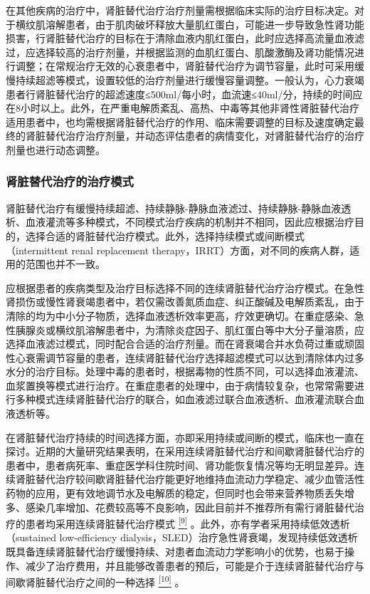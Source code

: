 在其他疾病的治疗中，肾脏替代治疗治疗剂量需根据临床实际的治疗目标决定。对于横纹肌溶解患者，由于肌肉破坏释放大量肌红蛋白，可能进一步导致急性肾功能损害，行肾脏替代治疗的目标在于清除血液内肌红蛋白，此时应选择高流量血液滤过，应选择较高的治疗剂量，并根据监测的血肌红蛋白、肌酸激酶及肾功能情况进行调整；在常规治疗无效的心衰患者中，肾脏替代治疗为调节容量，此时可采用缓慢持续超滤等模式，设置较低的治疗剂量进行缓慢容量调整。一般认为，心力衰竭患者行肾脏替代治疗的超滤速度≤500ml/每小时，血流速≤40ml/分，持续的时间应在8小时以上。此外，在严重电解质紊乱、高热、中毒等其他非肾性肾脏替代治疗适用患者中，也均需根据肾脏替代治疗的作用、临床需要调整的目标及速度确定最终的肾脏替代治疗治疗剂量，并动态评估患者的病情变化，对肾脏替代治疗的治疗剂量也进行动态调整。

\subsubsection{肾脏替代治疗的治疗模式}

肾脏替代治疗有缓慢持续超滤、持续静脉-静脉血液滤过、持续静脉-静脉血液透析、血液灌流等多种模式，不同模式治疗疾病的机制并不相同，因此应根据治疗目的，选择合适的肾脏替代治疗模式。此外，选择持续模式或间断模式（intermittent
renal replacement
therapy，IRRT）方面，对不同的疾病人群，适用的范围也并不一致。

应根据患者的疾病类型及治疗目标选择不同的连续肾脏替代治疗治疗模式。在急性肾损伤或慢性肾衰竭患者中，若仅需改善氮质血症、纠正酸碱及电解质紊乱，由于清除的均为中小分子物质，选择血液透析效率更高，疗效更确切。在重症感染、急性胰腺炎或横纹肌溶解患者中，为清除炎症因子、肌红蛋白等中大分子量溶质，应选择血液滤过模式，同时配合合适的治疗剂量。而在肾衰竭合并水负荷过重或顽固性心衰需调节容量的患者，连续肾脏替代治疗选择超滤模式可以达到清除体内过多水分的治疗目标。处理中毒的患者时，根据毒物的性质不同，可以选择血液灌流、血浆置换等模式进行治疗。在重症患者的处理中，由于病情较复杂，也常常需要进行多种模式连续肾脏替代治疗的联合，如血液滤过联合血液透析、血液灌流联合血液透析等。

在肾脏替代治疗持续的时间选择方面，亦即采用持续或间断的模式，临床也一直在探讨。近期的大量研究结果表明，在采用连续肾脏替代治疗和间歇肾脏替代治疗的患者中，患者病死率、重症医学科住院时间、肾功能恢复情况等均无明显差异。连续肾脏替代治疗较间歇肾脏替代治疗能更好地维持血流动力学稳定、减少血管活性药物的应用，更有效地调节水及电解质的稳定，但同时也会带来营养物质丢失增多、感染几率增加、花费较高等不良影响，因此目前并不推荐所有需行肾脏替代治疗的患者均采用连续肾脏替代治疗模式
\protect\hyperlink{text00018.htmlux5cux23ch9-17}{\textsuperscript{{[}9{]}}}
。此外，亦有学者采用持续低效透析（sustained low-efficiency
dialysis，SLED）治疗急性肾衰竭，发现持续低效透析既具备连续肾脏替代治疗缓慢持续、对患者血流动力学影响小的优势，也易于操作、减少了治疗费用，并且能够改善患者的预后，可能是介于连续肾脏替代治疗与间歇肾脏替代治疗之间的一种选择
\protect\hyperlink{text00018.htmlux5cux23ch10-17}{\textsuperscript{{[}10{]}}}
。


